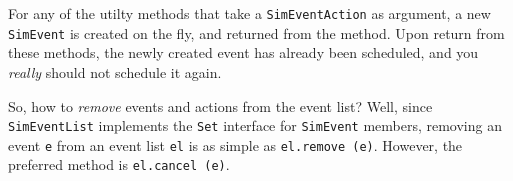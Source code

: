 For any of the utilty methods that take a \lstinline{SimEventAction}
  as argument, a new \lstinline{SimEvent} is created on the fly,
  and returned from the method.
Upon return from these methods,
  the newly created event has already been scheduled,
  and you {\em really\/} should not schedule it again.

So, how to {\em remove\/} events and actions from the event list?
Well, since \lstinline{SimEventList} implements the \lstinline{Set} interface for
  \lstinline{SimEvent} members, removing an event \lstinline{e}
  from an event list \lstinline{el} is as simple as
  \lstinline{el.remove (e)}.
However,
  the preferred method is \lstinline|el.cancel (e)|.
